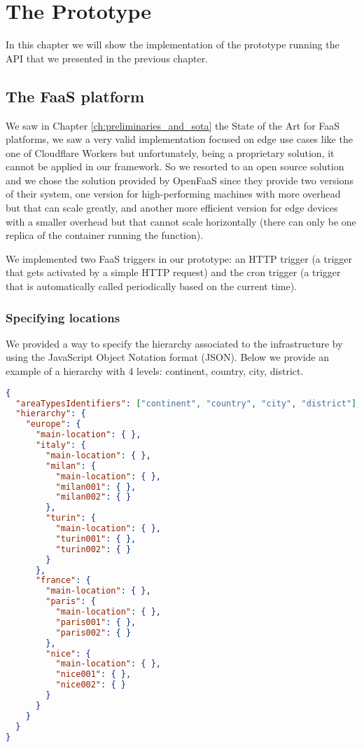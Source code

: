 \chapter{The Prototype}
\label{ch:prototype}

In this chapter we will show the implementation of the prototype running the API that we presented in the previous chapter.

\section{The FaaS platform}
We saw in Chapter \ref{ch:preliminaries_and_sota} the State of the Art for FaaS platforms, we saw a very valid implementation focused on edge use cases like the one of Cloudflare Workers but unfortunately, being a proprietary solution, it cannot be applied in our framework.
So we resorted to an open source solution and we chose the solution provided by OpenFaaS since they provide two versions of their system, one version for high-performing machines with more overhead but that can scale greatly, and another more efficient version for edge devices with a smaller overhead but that cannot scale horizontally (there can only be one replica of the container running the function).

We implemented two FaaS triggers in our prototype: an HTTP trigger (a trigger that gets activated by a simple HTTP request) and the cron trigger (a trigger that is automatically called periodically based on the current time).


\subsection{Specifying locations}
We provided a way to specify the hierarchy associated to the infrastructure by using the JavaScript Object Notation format (JSON).
Below we provide an example of a hierarchy with 4 levels: continent, country, city, district.

\begin{lstlisting}[language=json,firstnumber=1]
{
  "areaTypesIdentifiers": ["continent", "country", "city", "district"],
  "hierarchy": {
    "europe": {
      "main-location": { },
      "italy": {
        "main-location": { },
        "milan": {
          "main-location": { },
          "milan001": { },
          "milan002": { }
        },
        "turin": {
          "main-location": { },
          "turin001": { },
          "turin002": { }
        }
      },
      "france": {
        "main-location": { },
        "paris": {
          "main-location": { },
          "paris001": { },
          "paris002": { }
        },
        "nice": {
          "main-location": { },
          "nice001": { },
          "nice002": { }
        }
      }
    }
  }
}
\end{lstlisting}

